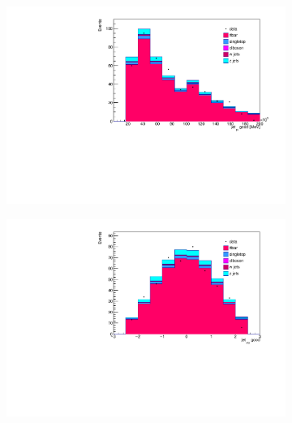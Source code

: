 \begin{figure}[H]
  \begin{subfigure}{0.5\textwidth}
    \centering
    \includegraphics[width=\linewidth]{plots_and_txt/stacked_plots/stacked_jet_pt_good.pdf}
    \caption{}
    \label{fig:stacked_lep_pt3}
  \end{subfigure}%
  \begin{subfigure}{0.5\textwidth}
    \centering
    \includegraphics[width=\linewidth]{plots_and_txt/stacked_plots/stacked_jet_eta_good.pdf}
    \caption{}
    \label{fig:stacked_btagged3}
  \end{subfigure}%
  \newline
  \begin{subfigure}{0.5\textwidth}
    \centering

\end{subfigure}
\end{figure}
